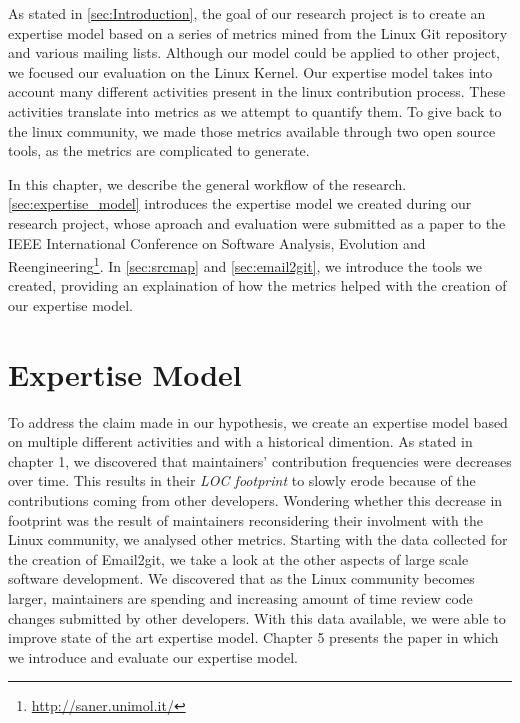\label{sec:Theme1}



As stated in \autoref{sec:Introduction}, the goal of our research project is to create an expertise model based on a series of metrics mined from the Linux Git repository and various mailing lists. Although our model could be applied to other project, we focused our evaluation on the Linux Kernel.
Our expertise model takes into account many different activities present in the linux contribution process. These activities translate into metrics as we attempt to quantify them. To give back to the linux community, we made those metrics available through two open source tools, as the metrics are complicated to generate.  

In this chapter, we describe the general workflow of the research. \autoref{sec:expertise_model} introduces the expertise model we created during our research project, whose aproach and evaluation were submitted as a paper to the IEEE International Conference on Software Analysis, Evolution and Reengineering\footnote{\url{http://saner.unimol.it/}}. In \autoref{sec:srcmap} and \autoref{sec:email2git}, we introduce the tools we created, providing an explaination of how the metrics helped with the creation of our expertise model. 


\section{Expertise Model}
\label{sec:expertise_model}

To address the claim made in our hypothesis, we create an expertise model based on multiple different activities and with a historical dimention. As stated in chapter 1, we discovered that maintainers' contribution frequencies were decreases over time. This results in their \textit{LOC footprint} to slowly erode because of the contributions coming from other developers. Wondering whether this decrease in footprint was the result of maintainers reconsidering their involment with the Linux community, we analysed other metrics. Starting with the data collected for the creation of Email2git, we take a look at the other aspects of large scale software development. We discovered that as the Linux community becomes larger, maintainers are spending and increasing amount of time review code changes submitted by other developers. With this data available, we were able to improve state of the art expertise model. Chapter 5 presents the paper in which we introduce and evaluate our expertise model. 








